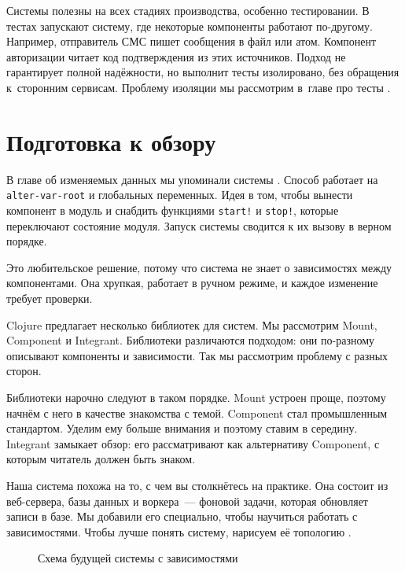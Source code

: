 Системы полезны на всех стадиях производства, особенно тестировании. В тестах
запускают систему, где некоторые компоненты работают по-другому. Например,
отправитель СМС пишет сообщения в файл или атом. Компонент авторизации читает
код подтверждения из этих источников. Подход не гарантирует полной надёжности,
но выполнит тесты изолировано, без обращения к~сторонним сервисам. Проблему
изоляции мы рассмотрим в~главе про тесты .

\section{Подготовка к обзору}


В главе об изменяемых данных мы упоминали системы . Способ
работает на \verb|alter-var-root| и глобальных переменных. Идея в том, чтобы
вынести компонент в модуль и снабдить функциями \verb|start!| и
\verb|stop!|, которые переключают состояние модуля. Запуск системы сводится к
их вызову в верном порядке.

Это любительское решение, потому что система не знает о зависимостях между
компонентами. Она хрупкая, работает в ручном режиме, и каждое изменение требует
проверки.

Clojure предлагает несколько библиотек для систем. Мы рассмотрим Mount,
Component и Integrant. Библиотеки различаются подходом: они по-разному описывают
компоненты и зависимости. Так мы рассмотрим проблему с разных сторон.

Библиотеки нарочно следуют в таком порядке. Mount устроен проще, поэтому начнём
с него в качестве знакомства с темой. Component стал промышленным
стандартом. Уделим ему больше внимания и поэтому ставим в середину. Integrant
замыкает обзор: его рассматривают как альтернативу Component, с которым читатель
должен быть знаком.

Наша система похожа на то, с чем вы столкнётесь на практике. Она состоит из
веб-сервера, базы данных и воркера~--- фоновой задачи, которая обновляет записи
в базе. Мы добавили его специально, чтобы научиться работать с
зависимостями. Чтобы лучше понять систему, нарисуем её топологию .

\begin{figure}[ht!]
  \caption{Схема будущей системы с зависимостями}
  \label{fig:chart-system}
\end{figure}

